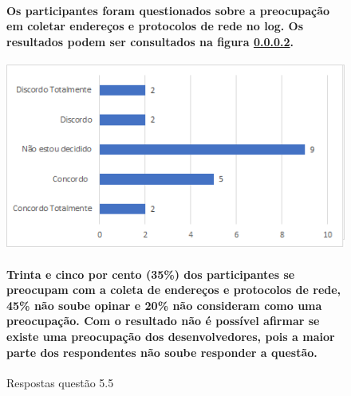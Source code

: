 \begin{figure}[!t]
\centering
\paragraph{Os participantes foram questionados sobre a preocupação em coletar endereços e protocolos de rede no log. Os resultados podem ser consultados na figura \ref{fig:5.5}.}
\includegraphics[scale=0.7]{figuras das questoes/5.5.png}
\caption{Respostas questão 5.5}
\paragraph{Trinta e cinco por cento (35{\%}) dos participantes se preocupam com a coleta de endereços e protocolos de rede, 45{\%} não soube opinar e 20{\%} não consideram como uma preocupação. Com o resultado não é possível afirmar se existe uma preocupação dos desenvolvedores, pois a maior parte dos respondentes não soube responder a questão.}
\label{fig:5.5}
\end{figure}
